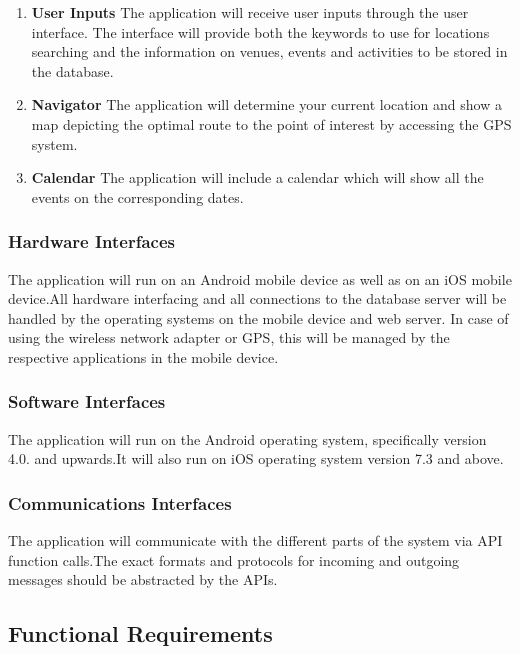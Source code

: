 \documentclass[a4paper,10pt]{article}
\begin{document}
\begin{enumerate}  
                     \item \textbf{User Inputs}
        The application will receive user inputs through the user interface. The interface will provide both the keywords to use for locations searching and the information on venues, events and activities to be stored in the database.
                      \item \textbf{Navigator}
                     The application will determine your current location  and show a map depicting the optimal route to the point of interest by accessing the GPS system.

                      \item \textbf{Calendar}
                  The application will include a calendar which will show all the events on the corresponding dates.


\end{enumerate}
                 \subsubsection{Hardware Interfaces}
The application will run on an Android mobile device as well as on an iOS mobile device.All hardware interfacing and all connections to the database server will be handled by the operating systems on the mobile device and web server. In case of using the wireless network adapter or GPS, this will be managed by the respective applications in the mobile device.

                 \subsubsection{Software Interfaces}
The application will run on the Android operating system, specifically version 4.0. and upwards.It will also run on iOS operating system version 7.3 and above.

                 \subsubsection{Communications Interfaces}
The application will communicate with the different parts of the system via API function calls.The exact formats and protocols for incoming and outgoing messages should be abstracted by the APIs.

	\subsection{Functional Requirements}
\end{document}
